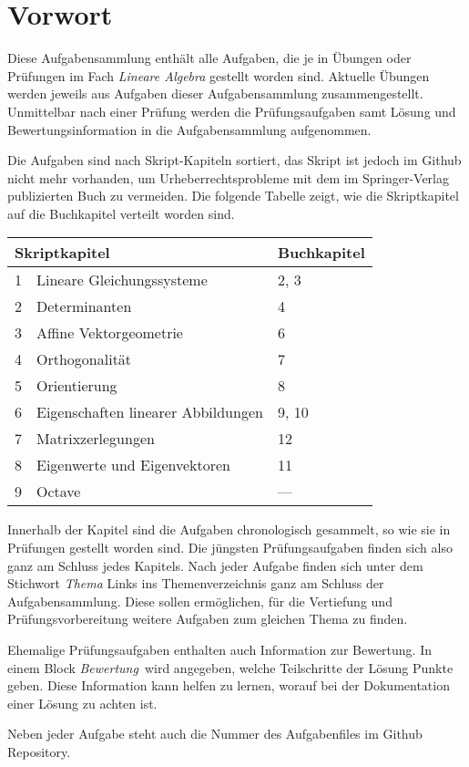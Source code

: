 %
%
%
\chapter*{Vorwort}
Diese Aufgabensammlung enthält alle Aufgaben, die je in Übungen oder
Prüfungen im Fach {\em Lineare Algebra} gestellt worden sind.
Aktuelle Übungen werden jeweils aus Aufgaben dieser Aufgabensammlung
zusammengestellt.
Unmittelbar nach einer Prüfung werden die Prüfungsaufgaben samt
Lösung und Bewertungsinformation in die Aufgabensammlung aufgenommen.

Die Aufgaben sind nach Skript-Kapiteln sortiert, das Skript ist
jedoch im Github nicht mehr vorhanden, um Urheberrechtsprobleme
mit dem im Springer-Verlag publizierten Buch zu vermeiden.
Die folgende Tabelle zeigt, wie die Skriptkapitel auf die Buchkapitel
verteilt worden sind.
\begin{center}
\begin{tabular}{lll}
\hline
\multicolumn{2}{l}{Skriptkapitel}
                      & Buchkapitel \\
\hline
1 &Lineare Gleichungssysteme         &  2, 3       \\
2 &Determinanten                     &  4          \\
3 &Affine Vektorgeometrie            &  6          \\
4 &Orthogonalität                    &  7          \\
5 &Orientierung                      &  8          \\
6 &Eigenschaften linearer Abbildungen&  9, 10      \\
7 &Matrixzerlegungen                 &  12         \\
8 &Eigenwerte und Eigenvektoren      &  11         \\
9 &Octave                            &  ---	   \\
\hline
\end{tabular}
\end{center}
Innerhalb der Kapitel sind die Aufgaben chronologisch gesammelt,
so wie sie in Prüfungen gestellt worden sind.
Die jüngsten Prüfungsaufgaben finden sich also ganz am Schluss jedes
Kapitels.
Nach jeder Aufgabe finden sich unter dem Stichwort {\em Thema} Links
ins Themenverzeichnis ganz am Schluss der Aufgabensammlung.
Diese sollen ermöglichen, für die Vertiefung und Prüfungsvorbereitung
weitere Aufgaben zum gleichen Thema zu finden.

Ehemalige Prüfungsaufgaben enthalten auch Information zur Bewertung.
In einem Block {\em Bewertung} wird angegeben, welche Teilschritte
der Lösung Punkte geben.
Diese Information kann helfen zu lernen, worauf bei der Dokumentation
einer Lösung zu achten ist.

Neben jeder Aufgabe steht auch die Nummer des Aufgabenfiles im
Github Repository.

